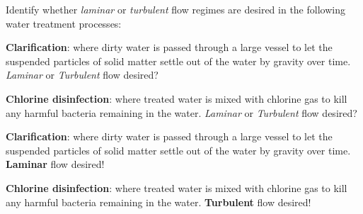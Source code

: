 

Identify whether {\it laminar} or {\it turbulent} flow regimes are desired in the following water treatment processes:

\vskip 10pt

{\bf Clarification}: where dirty water is passed through a large vessel to let the suspended particles of solid matter settle out of the water by gravity over time.  {\it Laminar} or {\it Turbulent} flow desired?

\vskip 10pt

{\bf Chlorine disinfection}: where treated water is mixed with chlorine gas to kill any harmful bacteria remaining in the water.  {\it Laminar} or {\it Turbulent} flow desired?








{\bf Clarification}: where dirty water is passed through a large vessel to let the suspended particles of solid matter settle out of the water by gravity over time.  {\bf Laminar} flow desired!

\vskip 10pt

{\bf Chlorine disinfection}: where treated water is mixed with chlorine gas to kill any harmful bacteria remaining in the water.  {\bf Turbulent} flow desired!
 










